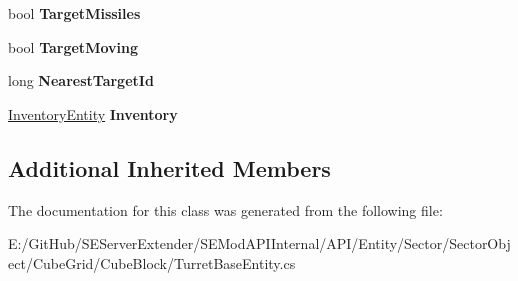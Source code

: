 \begin{DoxyCompactItemize}
\item 
\hypertarget{class_s_e_mod_a_p_i_internal_1_1_a_p_i_1_1_entity_1_1_sector_1_1_sector_object_1_1_cube_grid_1_18bc384bbaf571fbfc8546173f456649e_a2fb45b79009068d2e067155be1cac6ab}{}bool {\bfseries Target\+Missiles}\label{class_s_e_mod_a_p_i_internal_1_1_a_p_i_1_1_entity_1_1_sector_1_1_sector_object_1_1_cube_grid_1_18bc384bbaf571fbfc8546173f456649e_a2fb45b79009068d2e067155be1cac6ab}

\item 
\hypertarget{class_s_e_mod_a_p_i_internal_1_1_a_p_i_1_1_entity_1_1_sector_1_1_sector_object_1_1_cube_grid_1_18bc384bbaf571fbfc8546173f456649e_a8a43f4ab6170de7299a16d7173cced95}{}bool {\bfseries Target\+Moving}\label{class_s_e_mod_a_p_i_internal_1_1_a_p_i_1_1_entity_1_1_sector_1_1_sector_object_1_1_cube_grid_1_18bc384bbaf571fbfc8546173f456649e_a8a43f4ab6170de7299a16d7173cced95}

\item 
\hypertarget{class_s_e_mod_a_p_i_internal_1_1_a_p_i_1_1_entity_1_1_sector_1_1_sector_object_1_1_cube_grid_1_18bc384bbaf571fbfc8546173f456649e_a168a955c143ea54480a63ff56814ac08}{}long {\bfseries Nearest\+Target\+Id}\label{class_s_e_mod_a_p_i_internal_1_1_a_p_i_1_1_entity_1_1_sector_1_1_sector_object_1_1_cube_grid_1_18bc384bbaf571fbfc8546173f456649e_a168a955c143ea54480a63ff56814ac08}

\item 
\hypertarget{class_s_e_mod_a_p_i_internal_1_1_a_p_i_1_1_entity_1_1_sector_1_1_sector_object_1_1_cube_grid_1_18bc384bbaf571fbfc8546173f456649e_a5c5eb274e4a8c09cbe7eaa4821619c04}{}\hyperlink{class_s_e_mod_a_p_i_internal_1_1_a_p_i_1_1_entity_1_1_inventory_entity}{Inventory\+Entity} {\bfseries Inventory}\label{class_s_e_mod_a_p_i_internal_1_1_a_p_i_1_1_entity_1_1_sector_1_1_sector_object_1_1_cube_grid_1_18bc384bbaf571fbfc8546173f456649e_a5c5eb274e4a8c09cbe7eaa4821619c04}

\end{DoxyCompactItemize}
\subsection*{Additional Inherited Members}


The documentation for this class was generated from the following file\+:\begin{DoxyCompactItemize}
\item 
E\+:/\+Git\+Hub/\+S\+E\+Server\+Extender/\+S\+E\+Mod\+A\+P\+I\+Internal/\+A\+P\+I/\+Entity/\+Sector/\+Sector\+Object/\+Cube\+Grid/\+Cube\+Block/Turret\+Base\+Entity.\+cs\end{DoxyCompactItemize}
